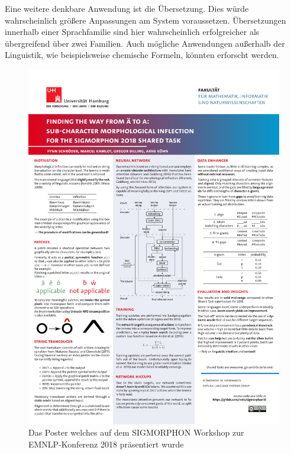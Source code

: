 \documentclass[11pt,a4paper]{article}
\begin{document}
Eine weitere denkbare Anwendung ist die Übersetzung. Dies würde wahrscheinlich größere Anpassungen am System voraussetzen. Übersetzungen innerhalb einer Sprachfamilie sind hier wahrscheinlich erfolgreicher als übergreifend über zwei Familien. Auch mögliche Anwendungen außerhalb der Linguistik, wie beispielsweise chemische Formeln, könnten erforscht werden.




\appendix
\begin{figure}
	\centering
	\includegraphics[width=\textwidth]{poster-emnlp.pdf}
	\caption{Das Poster welches auf dem SIGMORPHON Workshop zur EMNLP-Konferenz 2018 präsentiert wurde}
	\label{app:poster}
\end{figure}
\end{document}
